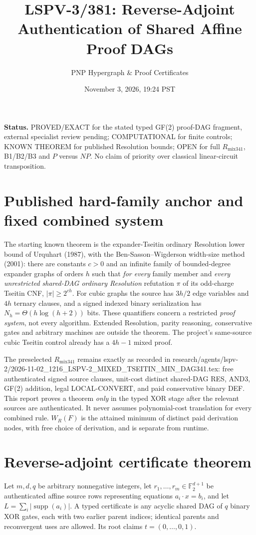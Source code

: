 \documentclass[11pt]{article}
\title{LSPV-3/381: Reverse-Adjoint Authentication of Shared Affine Proof DAGs}
\author{PNP Hypergraph \& Proof Certificates}
\date{November 3, 2026, 19:24 PST}
\begin{document}
\maketitle
\noindent\textbf{Status.} PROVED/EXACT for the stated typed GF(2) proof-DAG fragment, external specialist review pending; COMPUTATIONAL for finite controls; KNOWN THEOREM for published Resolution bounds; OPEN for full \(R_{\mathrm{mix341}}\), B1/B2/B3 and \(P\) versus \(NP\). No claim of priority over classical linear-circuit transposition.

\section*{Published hard-family anchor and fixed combined system}
The starting known theorem is the expander-Tseitin ordinary Resolution lower bound of Urquhart (1987), with the Ben-Sasson--Wigderson width-size method (2001): there are constants \(c>0\) and an infinite family of bounded-degree expander graphs of orders \(h\) such that \emph{for every} family member and \emph{every unrestricted shared-DAG ordinary Resolution} refutation \(\pi\) of its odd-charge Tseitin CNF, \( |\pi|\ge 2^{ch}\). For cubic graphs the source has \(3h/2\) edge variables and \(4h\) ternary clauses, and a signed indexed binary serialization has \(N_h=\Theta(h\log(h+2))\) bits. These quantifiers concern a restricted \emph{proof system}, not every algorithm. Extended Resolution, parity reasoning, conservative gates and arbitrary machines are outside the theorem. The project's same-source cubic Tseitin control already has a \(4h-1\) mixed proof.

The preselected \(R_{\mathrm{mix341}}\) remains exactly as recorded in research/agents/lspv-2/2026-11-02\_1216\_LSPV-2\_MIXED\_TSEITIN\_MIN\_DAG341.tex: free authenticated signed source clauses, unit-cost distinct shared-DAG RES, AND3, GF(2) addition, legal LOCAL-CONVERT, and paid conservative binary DEF. This report proves a theorem \emph{only} in the typed XOR stage after the relevant sources are authenticated. It never assumes polynomial-cost translation for every combined rule. \(W_R(F)\) is the attained minimum of distinct paid derivation nodes, with free choice of derivation, and is separate from runtime.

\section*{Reverse-adjoint certificate theorem}
Let \(m,d,q\) be arbitrary nonnegative integers, let \(r_1,\ldots,r_m\in\mathbb F_2^{d+1}\) be authenticated affine source rows representing equations \(a_i\cdot x=b_i\), and let \(L=\sum_i|\operatorname{supp}(a_i)|\). A typed certificate is any acyclic shared DAG of \(q\) binary XOR gates, each with two earlier parent indices; identical parents and reconvergent uses are allowed. Its root claims \(t=(0,\ldots,0,1)\).
\end{document}
